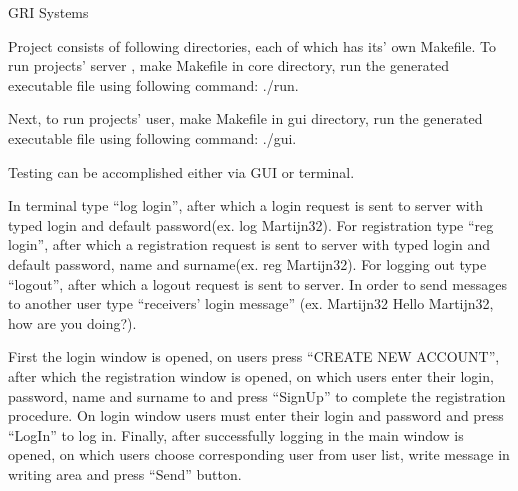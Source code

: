 G\+RI Systems

Project consists of following directories, each of which has its’ own Makefile. To run projects’ server , make Makefile in core directory, run the generated executable file using following command\+: ./run.

Next, to run projects’ user, make Makefile in gui directory, run the generated executable file using following command\+: ./gui.

Testing can be accomplished either via G\+UI or terminal.

In terminal type “log login”, after which a login request is sent to server with typed login and default password(ex. log Martijn32). For registration type “reg login”, after which a registration request is sent to server with typed login and default password, name and surname(ex. reg Martijn32). For logging out type “logout”, after which a logout request is sent to server. In order to send messages to another user type “receivers’ login message” (ex. Martijn32 Hello Martijn32, how are you doing?).

First the login window is opened, on users press “\+C\+R\+E\+A\+TE N\+EW A\+C\+C\+O\+U\+N\+T”, after which the registration window is opened, on which users enter their login, password, name and surname to and press “\+Sign\+Up” to complete the registration procedure. On login window users must enter their login and password and press “\+Log\+In” to log in. Finally, after successfully logging in the main window is opened, on which users choose corresponding user from user list, write message in writing area and press “\+Send” button. 